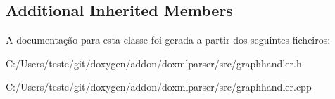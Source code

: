 \subsection*{Additional Inherited Members}


A documentação para esta classe foi gerada a partir dos seguintes ficheiros\-:\begin{DoxyCompactItemize}
\item 
C\-:/\-Users/teste/git/doxygen/addon/doxmlparser/src/graphhandler.\-h\item 
C\-:/\-Users/teste/git/doxygen/addon/doxmlparser/src/graphhandler.\-cpp\end{DoxyCompactItemize}
